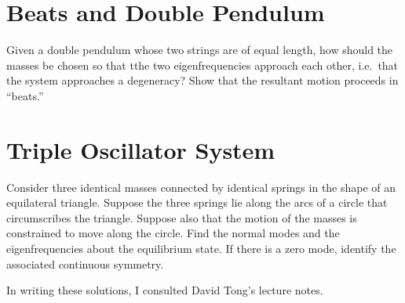 \documentclass[11pt]{article}
\newenvironment{statement}
{
    \color{darkgray}
    \ignorespaces
}
{
    \bigskip
}
\newenvironment{solution}
{
    \paragraph{Solution.}
    \ignorespaces
}
{
    \bigskip
}
\begin{document}
%	


\section{Beats and Double Pendulum}
\begin{statement}
	Given a double pendulum whose two strings are of equal length, how should the masses be chosen so that tthe two eigenfrequencies approach each other, i.e.~that the system approaches a degeneracy?  Show that the resultant motion proceeds in ``beats.''
\end{statement}

%


\section{Triple Oscillator System}
\begin{statement}
	Consider three identical masses connected by identical springs in the shape of an equilateral triangle.  Suppose the three springs lie along the arcs of a circle that circumscribes the triangle.  Suppose also that the motion of the masses is constrained to move along the circle.  Find the normal modes and the eigenfrequencies about the equilibrium state.  If there is a zero mode, identify the associated continuous symmetry.
\end{statement}

%

	
In writing these solutions, I consulted David Tong's lecture notes.
\end{document}
